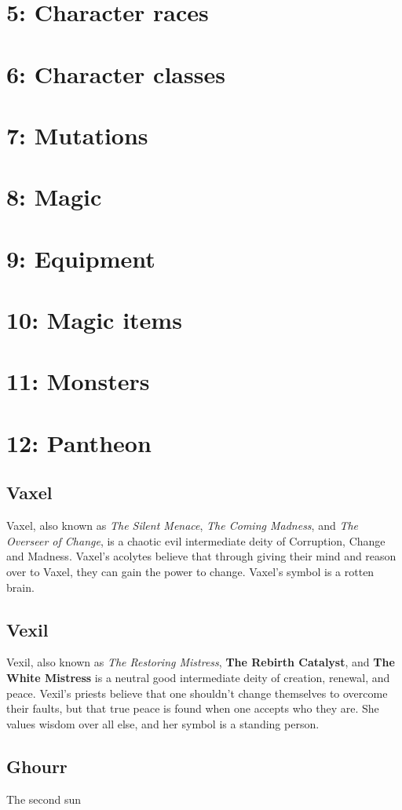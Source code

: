 \documentclass[a4paper]{article}
\begin{document}
\section{5: Character races}

\section{6: Character classes}

\section{7: Mutations}

\section{8: Magic}

\section{9: Equipment}

\section{10: Magic items}

\section{11: Monsters}

\section{12: Pantheon}

\subsection{Vaxel}
Vaxel, also known as \textit{The Silent Menace}, \textit{The Coming Madness}, and \textit{The Overseer of Change}, is a chaotic evil intermediate deity of Corruption, Change and Madness. Vaxel's acolytes believe that through giving their mind and reason over to Vaxel, they can gain the power to change. Vaxel's symbol is a rotten brain.\\


\subsection{Vexil}
Vexil, also known as \textit{The Restoring Mistress}, \textbf{The Rebirth Catalyst}, and \textbf{The White Mistress} is a neutral good intermediate deity of creation, renewal, and peace. Vexil's priests believe that one shouldn't change themselves to overcome their faults, but that true peace is found when one accepts who they are. She values wisdom over all else, and her symbol is a standing person.

\subsection{Ghourr}
The second sun
\end{document}
